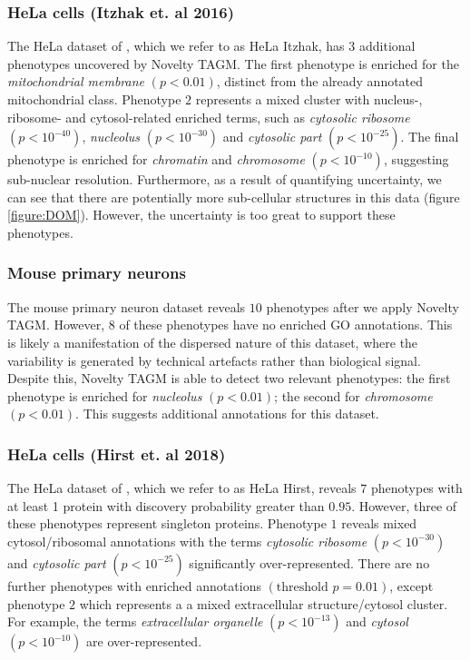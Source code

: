\documentclass[12pt,english]{article}
\begin{document}
\subsubsection{HeLa cells (Itzhak et. al 2016)}
The HeLa dataset of \cite{Itzhak:2016}, which we refer to as HeLa Itzhak, has $3$ additional phenotypes uncovered by Novelty TAGM. The first phenotype is enriched for the \textit{mitochondrial membrane} $(p < 0.01)$, distinct from the already annotated mitochondrial class. Phenotype $2$ represents a mixed cluster with nucleus-, ribosome- and cytosol-related enriched terms, such as \textit{cytosolic ribosome} $(p < 10^{-40})$, \textit{nucleolus} $(p < 10^{-30})$ and \textit{cytosolic part} $(p < 10^{-25})$. The final phenotype is enriched for \textit{chromatin} and \textit{chromosome} $(p < 10^{-10})$, suggesting sub-nuclear resolution. Furthermore, as a result of quantifying uncertainty, we can see that there are potentially more sub-cellular structures in this data (figure \ref{figure:DOM}). However, the uncertainty is too great to support these phenotypes. 
\subsubsection{Mouse primary neurons}
The mouse primary neuron dataset reveals $10$ phenotypes after we apply Novelty TAGM. However, $8$ of these phenotypes have no enriched GO annotations. This is likely a manifestation of the dispersed nature of this dataset, where the variability is generated by technical artefacts rather than biological signal. Despite this, Novelty TAGM is able to detect two relevant phenotypes: the first phenotype is enriched for \textit{nucleolus} $(p < 0.01)$; the second for \textit{chromosome} $(p < 0.01)$. This suggests additional annotations for this dataset.
\subsubsection{HeLa cells (Hirst et. al 2018)}
The HeLa dataset of \cite{Hirst:2018}, which we refer to as HeLa Hirst, reveals $7$ phenotypes with at least 1 protein with discovery probability greater than $0.95$. However, three of these phenotypes represent singleton proteins. Phenotype $1$ reveals mixed cytosol/ribosomal annotations with the terms \textit{cytosolic ribosome} $(p < 10^{-30})$ and \textit{cytosolic part} $(p < 10^{-25})$ significantly over-represented. There are no further phenotypes with enriched annotations $(\text{threshold } p = 0.01)$, except phenotype $2$ which represents a a mixed extracellular structure/cytosol cluster. For example, the terms \textit{extracellular organelle} $(p <10^{-13})$ and \textit{cytosol} $(p < 10^{-10})$ are over-represented.
\end{document}
